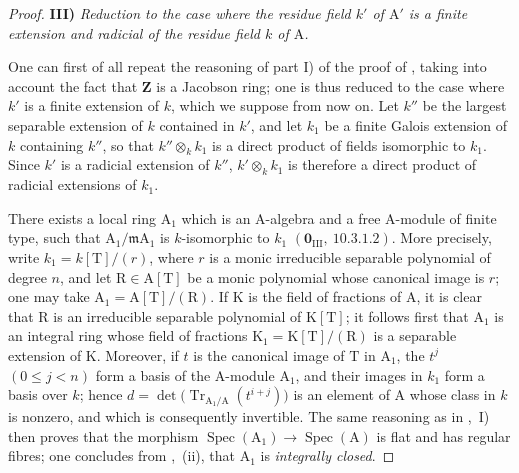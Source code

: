 \begin{proof}
\medskip
\noindent\textbf{III)} \emph{Reduction to the case where the residue field $k'$ of $\mathrm{A}'$ is a finite extension and radicial of the
residue field $k$ of $\mathrm{A}$.}

\medskip
One can first of all repeat the reasoning of part I) of the
proof of , taking into account the fact that $\mathbf{Z}$ is a
Jacobson ring; one is thus reduced to the case where $k'$ is a finite extension of $k$, which we suppose from now on.
Let $k''$ be the largest separable extension of $k$ contained in $k'$, and let $k_1$ be a finite Galois extension of $k$ containing $k''$, so that $k''\otimes_k k_1$ is a direct product of fields isomorphic to $k_1$.
Since $k'$ is a radicial extension of $k''$, $k'\otimes_k k_1$ is therefore a direct product of radicial extensions of $k_1$.

There exists a local ring $\mathrm{A}_1$ which is an $\mathrm{A}$-algebra and a free $\mathrm{A}$-module of finite type, such that $\mathrm{A}_1/\mathfrak{m}\mathrm{A}_1$ is $k$-isomorphic to $k_1$ $(\mathbf{0}_{\mathrm{III}},~10.3.1.2)$.
More precisely, write $k_1=k[\mathrm{T}]/(r)$, where $r$ is a monic irreducible separable polynomial of degree $n$, and let $\mathrm{R}\in\mathrm{A}[\mathrm{T}]$ be a monic polynomial whose canonical image is $r$; one may take $\mathrm{A}_1=\mathrm{A}[\mathrm{T}]/(\mathrm{R})$.
If $\mathrm{K}$ is the field of fractions of $\mathrm{A}$, it is clear that $\mathrm{R}$ is an irreducible separable polynomial of $\mathrm{K}[\mathrm{T}]$; it follows first that $\mathrm{A}_1$ is an integral ring whose field of fractions $\mathrm{K}_1=\mathrm{K}[\mathrm{T}]/(\mathrm{R})$ is a separable extension of $\mathrm{K}$.
Moreover, if $t$ is the canonical image of $\mathrm{T}$ in $\mathrm{A}_1$, the $t^j$ $(0\leq j<n)$ form a basis of the $\mathrm{A}$-module $\mathrm{A}_1$, and their images in $k_1$ form a basis over $k$; hence $d=\det\bigl(\operatorname{Tr}_{\mathrm{A}_1/\mathrm{A}}(t^{i+j})\bigr)$ is an element of $\mathrm{A}$ whose class in $k$ is nonzero, and which is consequently invertible.
The same reasoning as in ,~I) then proves that the morphism $\operatorname{Spec}(\mathrm{A}_1)\to\operatorname{Spec}(\mathrm{A})$ is flat and has regular fibres; one concludes from ,~(ii), that $\mathrm{A}_1$ is \emph{integrally closed}.


\end{proof}
